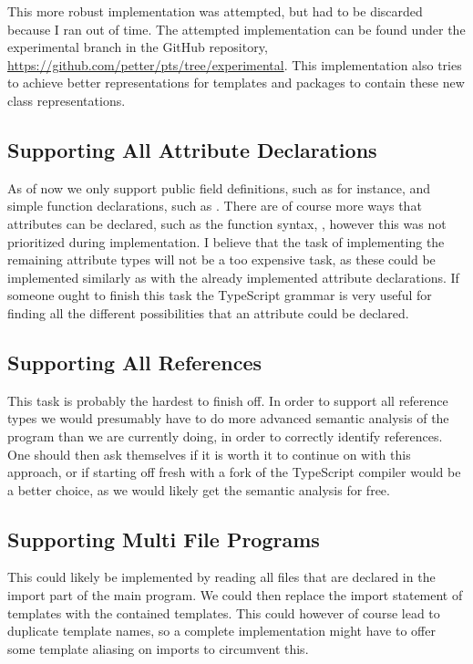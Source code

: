 This more robust implementation was attempted, but had to be discarded because I ran out of time.
The attempted implementation can be found under the experimental branch in the GitHub repository, \url{https://github.com/petter/pts/tree/experimental}.
This implementation also tries to achieve better representations for templates and packages to contain these new class representations.

\subsection{Supporting All Attribute Declarations}\label{subsec:supporting-all-attribute-declarations}

As of now we only support public field definitions, such as  for instance, and simple function declarations, such as .
There are of course more ways that attributes can be declared, such as the function syntax, , however this was not prioritized during implementation.
I believe that the task of implementing the remaining attribute types will not be a too expensive task, as these could be implemented similarly as with the already implemented attribute declarations.
If someone ought to finish this task the TypeScript grammar is very useful for finding all the different possibilities that an attribute could be declared.

\subsection{Supporting All References}\label{subsec:supporting-all-references}

This task is probably the hardest to finish off.
In order to support all reference types we would presumably have to do more advanced semantic analysis of the program than we are currently doing, in order to correctly identify references.
One should then ask themselves if it is worth it to continue on with this approach, or if starting off fresh with a fork of the TypeScript compiler would be a better choice, as we would likely get the semantic analysis for free.

\subsection{Supporting Multi File Programs}\label{subsec:supporting-multi-file-programs}

This could likely be implemented by reading all files that are declared in the import part of the main program.
We could then replace the import statement of templates with the contained templates.
This could however of course lead to duplicate template names, so a complete implementation might have to offer some template aliasing on imports to circumvent this.